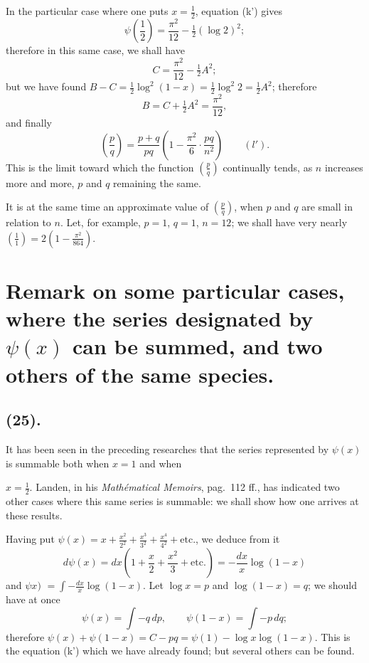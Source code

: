 \documentclass{article}
\begin{document}
In the particular case where one puts $x=\frac{1}{2}$, equation (k') gives
\[ \psi\left(\frac{1}{2}\right)=\frac{\pi^{2}}{12}-\tfrac{1}{2}(\log 2)^{2}; \]
therefore in this same case, we shall have
\[ C=\frac{\pi^{2}}{12}-\tfrac{1}{2}A^{2}; \]
but we have found $B-C=\frac{1}{2}\log^{2}(1-x)=\frac{1}{2}\log^{2}2=\frac{1}{2}A^{2}$; therefore
\[ B=C+\tfrac{1}{2}A^{2}=\frac{\pi^{2}}{12}, \]
and finally
\[ \left(\frac{p}{q}\right)=\frac{p+q}{pq}\left(1-\frac{\pi^{2}}{6}\cdot\frac{pq}{n^{2}}\right)\qquad(l'). \]
This is the limit toward which the function $\left(\frac{p}{q}\right)$ continually tends, as $n$ increases more and more, $p$ and $q$ remaining the same.

It is at the same time an approximate value of $\left(\frac{p}{q}\right)$, when $p$ and $q$ are small in relation to $n$. Let, for example, $p=1$, $q=1$, $n=12$; we shall have very nearly $\left(\frac{1}{1}\right)=2\left(1-\frac{\pi^{2}}{864}\right)$.

\section*{Remark on some particular cases, where the series designated by $\psi(x)$ can be summed, and two others of the same species.}

\subsection*{(25).}

It has been seen in the preceding researches that the series represented by $\psi(x)$ is summable both when $x=1$ and when

$x=\frac{1}{2}$. Landen, in his \emph{Mathématical Memoirs}, pag.~112 ff., has indicated two other cases where this same series is summable: we shall show how one arrives at these results.

Having put $\psi(x)=x+\frac{x^{2}}{2^{2}}+\frac{x^{3}}{3^{2}}+\frac{x^{4}}{4^{2}}+\text{etc.}$, we deduce from it
\[ d\psi(x)=dx\left(1+\frac{x}{2}+\frac{x^{2}}{3}+\text{etc.}\right)=-\frac{dx}{x}\log(1-x) \]
and $\psi x)$ $=\displaystyle\int-\frac{dx}{x}\log(1-x)$. Let $\log x=p$ and $\log(1-x)=q$; we should have at once
\[ \psi(x)=\int-q\,dp,\qquad\psi(1-x)=\int-p\,dq; \]
therefore $\psi(x)+\psi(1-x)=C-pq=\psi(1)-\log x\log(1-x)$.
This is the equation (k') which we have already found; but several others can be found.
\end{document}
